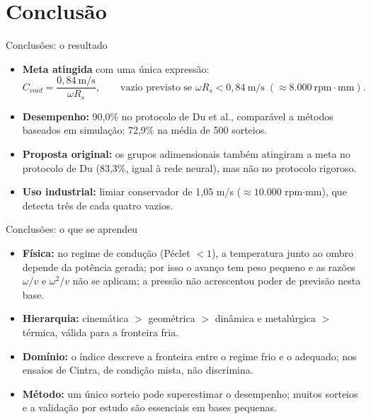 \documentclass[aspectratio=169,11pt]{beamer}
\newenvironment{bullets}{\begin{itemize}\setlength{\itemsep}{5pt}}{\end{itemize}}
\begin{document}
\section{Conclusão}
\begin{frame}{Conclusões: o resultado}
\begin{bullets}
  \item \textbf{Meta atingida} com uma única expressão:
  \[ C_{void} = \frac{0{,}84~\text{m/s}}{\omega R_s}, \qquad \text{vazio previsto se } \omega R_s < 0{,}84~\text{m/s} \;(\approx 8.000~\text{rpm}\cdot\text{mm}). \]
  \item \textbf{Desempenho:} 90,0\% no protocolo de Du et al., comparável a métodos baseados em simulação; 72,9\% na média de 500 sorteios.
  \item \textbf{Proposta original:} os grupos adimensionais também atingiram a meta no protocolo de Du (83,3\%, igual à rede neural), mas não no protocolo rigoroso.
  \item \textbf{Uso industrial:} limiar conservador de 1,05 m/s ($\approx 10.000$ rpm$\cdot$mm), que detecta três de cada quatro vazios.
\end{bullets}
\end{frame}

\begin{frame}{Conclusões: o que se aprendeu}
\vspace{0.2cm}
\begin{bullets}
  \item \textbf{Física:} no regime de condução (Péclet $< 1$), a temperatura junto ao ombro depende da potência gerada; por isso o avanço tem peso pequeno e as razões $\omega/v$ e $\omega^{2}/v$ não se aplicam; a pressão não acrescentou poder de previsão nesta base.
  \item \textbf{Hierarquia:} cinemática $>$ geométrica $>$ dinâmica e metalúrgica $>$ térmica, válida para a fronteira fria.
  \item \textbf{Domínio:} o índice descreve a fronteira entre o regime frio e o adequado; nos ensaios de Cintra, de condição mista, não discrimina.
  \item \textbf{Método:} um único sorteio pode superestimar o desempenho; muitos sorteios e a validação por estudo são essenciais em bases pequenas.
\end{bullets}
\end{frame}
\end{document}
